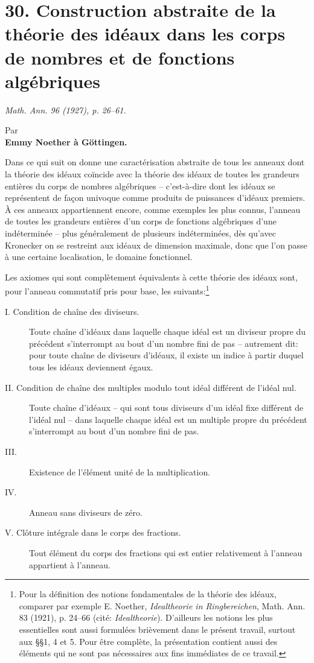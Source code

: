 \setcounter{footnote}{0}

\section*{30. Construction abstraite de la théorie des idéaux dans les corps de nombres et de fonctions algébriques}
\noindent\emph{Math. Ann. 96 (1927), p. 26--61.}

\begin{center}
Par\\[0.5em]
\textbf{Emmy Noether à Göttingen.}
\end{center}

Dans ce qui suit on donne une caractérisation abstraite de tous les anneaux dont la théorie des idéaux coïncide avec la théorie des idéaux de toutes les grandeurs entières du corps de nombres algébriques -- c'est-à-dire dont les idéaux se représentent de façon univoque comme produits de puissances d'idéaux premiers. À ces anneaux appartiennent encore, comme exemples les plus connus, l'anneau de toutes les grandeurs entières d'un corps de fonctions algébriques d'une indéterminée -- plus généralement de plusieurs indéterminées, dès qu'avec Kronecker on se restreint aux idéaux de dimension maximale, donc que l'on passe à une certaine localisation, le domaine fonctionnel.

Les axiomes qui sont complètement équivalents à cette théorie des idéaux sont, pour l'anneau commutatif pris pour base, les suivants:\footnote{Pour la définition des notions fondamentales de la théorie des idéaux, comparer par exemple E. Noether, \emph{Idealtheorie in Ringbereichen}, Math. Ann. 83 (1921), p. 24--66 (cité: \emph{Idealtheorie}). D'ailleurs les notions les plus essentielles sont aussi formulées brièvement dans le présent travail, surtout aux \S{}\S{}1, 4 et 5. Pour être complète, la présentation contient aussi des éléments qui ne sont pas nécessaires aux fins immédiates de ce travail.}

\begin{description}
\item[I. Condition de chaîne des diviseurs.] Toute chaîne d'idéaux dans laquelle chaque idéal est un diviseur propre du précédent s'interrompt au bout d'un nombre fini de pas -- autrement dit: pour toute chaîne de diviseurs d'idéaux, il existe un indice à partir duquel tous les idéaux deviennent égaux.
\item[II. Condition de chaîne des multiples modulo tout idéal différent de l'idéal nul.] Toute chaîne d'idéaux -- qui sont tous diviseurs d'un idéal fixe différent de l'idéal nul -- dans laquelle chaque idéal est un multiple propre du précédent s'interrompt au bout d'un nombre fini de pas.
\item[III.] Existence de l'élément unité de la multiplication.
\item[IV.] Anneau sans diviseurs de zéro.
\item[V. Clôture intégrale dans le corps des fractions.] Tout élément du corps des fractions qui est entier relativement à l'anneau appartient à l'anneau.
\end{description}

